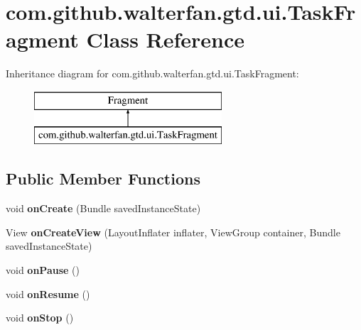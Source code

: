 \hypertarget{classcom_1_1github_1_1walterfan_1_1gtd_1_1ui_1_1TaskFragment}{\section{com.\-github.\-walterfan.\-gtd.\-ui.\-Task\-Fragment Class Reference}
\label{classcom_1_1github_1_1walterfan_1_1gtd_1_1ui_1_1TaskFragment}
}
Inheritance diagram for com.\-github.\-walterfan.\-gtd.\-ui.\-Task\-Fragment\-:\begin{figure}[H]
\begin{center}
\leavevmode
\includegraphics[height=2.000000cm]{classcom_1_1github_1_1walterfan_1_1gtd_1_1ui_1_1TaskFragment}
\end{center}
\end{figure}
\subsection*{Public Member Functions}
\begin{DoxyCompactItemize}
\item 
\hypertarget{classcom_1_1github_1_1walterfan_1_1gtd_1_1ui_1_1TaskFragment_ad9a7b86176e48b4d8b428725daa7cac6}{void {\bfseries on\-Create} (Bundle saved\-Instance\-State)}\label{classcom_1_1github_1_1walterfan_1_1gtd_1_1ui_1_1TaskFragment_ad9a7b86176e48b4d8b428725daa7cac6}

\item 
\hypertarget{classcom_1_1github_1_1walterfan_1_1gtd_1_1ui_1_1TaskFragment_a26c861ac1cde25cf11eddf621b4ebdae}{View {\bfseries on\-Create\-View} (Layout\-Inflater inflater, View\-Group container, Bundle saved\-Instance\-State)}\label{classcom_1_1github_1_1walterfan_1_1gtd_1_1ui_1_1TaskFragment_a26c861ac1cde25cf11eddf621b4ebdae}

\item 
\hypertarget{classcom_1_1github_1_1walterfan_1_1gtd_1_1ui_1_1TaskFragment_aca097f2af41861bdbd02ff23a76b0a84}{void {\bfseries on\-Pause} ()}\label{classcom_1_1github_1_1walterfan_1_1gtd_1_1ui_1_1TaskFragment_aca097f2af41861bdbd02ff23a76b0a84}

\item 
\hypertarget{classcom_1_1github_1_1walterfan_1_1gtd_1_1ui_1_1TaskFragment_a476771bb79bc3eb107934f1a4edbdc54}{void {\bfseries on\-Resume} ()}\label{classcom_1_1github_1_1walterfan_1_1gtd_1_1ui_1_1TaskFragment_a476771bb79bc3eb107934f1a4edbdc54}

\item 
\hypertarget{classcom_1_1github_1_1walterfan_1_1gtd_1_1ui_1_1TaskFragment_acc4ad151ef1e083bb1eaa4246e8da027}{void {\bfseries on\-Stop} ()}\label{classcom_1_1github_1_1walterfan_1_1gtd_1_1ui_1_1TaskFragment_acc4ad151ef1e083bb1eaa4246e8da027}

\end{DoxyCompactItemize}



